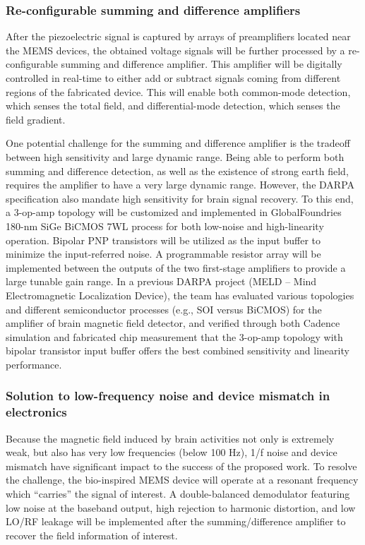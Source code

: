 \subsubsection{Re-configurable summing and difference amplifiers}

After the piezoelectric signal is captured by arrays of preamplifiers located near the MEMS devices, the obtained voltage signals will be further processed by a re-configurable summing and difference amplifier. This amplifier will be digitally controlled in real-time to either add or subtract signals coming from different regions of the fabricated device. This will enable both common-mode detection, which senses the total field, and differential-mode detection, which senses the field gradient.

One potential challenge for the summing and difference amplifier is the tradeoff between high sensitivity and large dynamic range. Being able to perform both summing and difference detection, as well as the existence of strong earth field, requires the amplifier to have a very large dynamic range. However, the DARPA specification also mandate high sensitivity for brain signal recovery. To this end, a 3-op-amp topology will be customized and implemented in GlobalFoundries 180-nm SiGe BiCMOS 7WL process for both low-noise and high-linearity operation. Bipolar PNP transistors will be utilized as the input buffer to minimize the input-referred noise. A programmable resistor array will be implemented between the outputs of the two first-stage amplifiers to provide a large tunable gain range. In a previous DARPA project (MELD – Mind Electromagnetic Localization Device), the team has evaluated various topologies and different semiconductor processes (e.g., SOI versus BiCMOS) for the amplifier of brain magnetic field detector, and verified through both Cadence simulation and fabricated chip measurement that the 3-op-amp topology with bipolar transistor input buffer offers the best combined sensitivity and linearity performance.

\subsubsection{Solution to low-frequency noise and device mismatch in electronics}

Because the magnetic field induced by brain activities not only is extremely weak, but also has very low frequencies (below 100 Hz), 1/f noise and device mismatch have significant impact to the success of the proposed work. To resolve the challenge, the bio-inspired MEMS device will operate at a resonant frequency which “carries” the signal of interest. A double-balanced demodulator featuring low noise at the baseband output, high rejection to harmonic distortion, and low LO/RF leakage will be implemented after the summing/difference amplifier to recover the field information of interest. 

